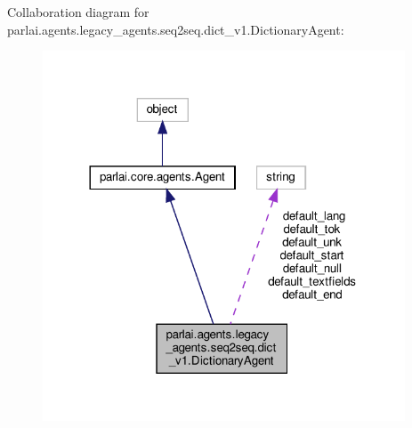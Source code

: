 Collaboration diagram for parlai.\+agents.\+legacy\+\_\+agents.\+seq2seq.\+dict\+\_\+v1.\+Dictionary\+Agent\+:
\nopagebreak
\begin{figure}[H]
\begin{center}
\leavevmode
\includegraphics[width=305pt]{d0/def/classparlai_1_1agents_1_1legacy__agents_1_1seq2seq_1_1dict__v1_1_1DictionaryAgent__coll__graph}
\end{center}
\end{figure}
